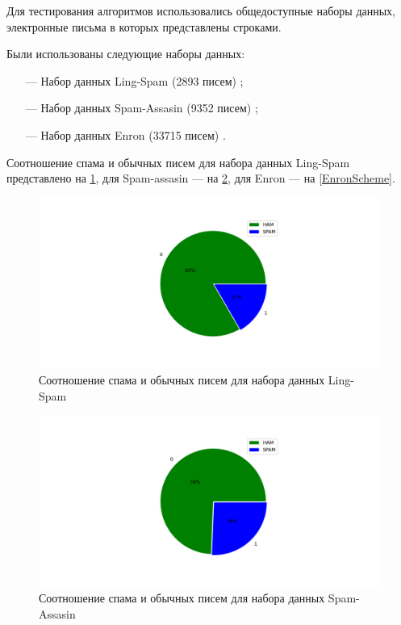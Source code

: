Для тестирования алгоритмов использовались общедоступные наборы данных, электронные
письма в которых представлены строками.

Были использованы следующие наборы данных:

\begin{itemize}
    \item[—] Набор данных Ling-Spam (2893 писем) \cite{LingSpam};
    \item[—] Набор данных Spam-Assasin (9352 писем) \cite{SpamAssasin};
    \item[—] Набор данных Enron (33715 писем) \cite{Enron}.
\end{itemize}

Соотношение спама и обычных писем для набора данных Ling-Spam представлено на \ref{LingSpamScheme},
для Spam-assasin — на \ref{SpamAssasinScheme}, для Enron — на \ref{EnronScheme}.

\begin{figure}[H]
    \centering
    \includegraphics[width=150mm]{static/ling_spam.png}
    \caption{Соотношение спама и обычных писем для набора данных Ling-Spam}
    \label{LingSpamScheme}
\end{figure}

\begin{figure}[H]
    \centering
    \includegraphics[width=150mm]{static/spam_assasin.png}
    \caption{Соотношение спама и обычных писем для набора данных Spam-Assasin}
    \label{SpamAssasinScheme}
\end{figure}

